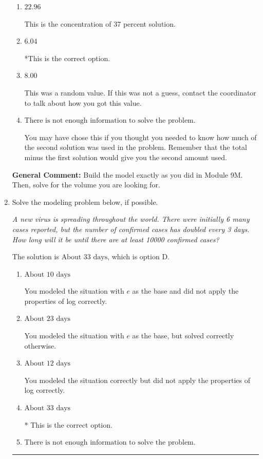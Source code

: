 \documentclass{extbook}[14pt]
\newcommand{\litem}[1]{\item #1

\rule{\textwidth}{0.4pt}}
\begin{document}
\begin{enumerate}
{\begin{enumerate}[label=\Alph*.]
This would be correct if Brittany used equal parts of each solution.
\item \( 22.96 \)

This is the concentration of 37 percent solution.
\item \( 6.04 \)

*This is the correct option.
\item \( 8.00 \)

This was a random value. If this was not a guess, contact the coordinator to talk about how you got this value.
\item \( \text{There is not enough information to solve the problem.} \)

You may have chose this if you thought you needed to know how much of the second solution was used in the problem. Remember that the total minus the first solution would give you the second amount used.
\end{enumerate}

\textbf{General Comment:} Build the model exactly as you did in Module 9M. Then, solve for the volume you are looking for.
}
\litem{
Solve the modeling problem below, if possible.

\begin{center}
    \textit{ A new virus is spreading throughout the world. There were initially 6 many cases reported, but the number of confirmed cases has doubled every 3 days. How long will it be until there are at least 10000 confirmed cases? }
\end{center}
The solution is \( \text{About } 33 \text{ days} \), which is option D.\begin{enumerate}[label=\Alph*.]
\item \( \text{About } 10 \text{ days} \)

You modeled the situation with $e$ as the base and did not apply the properties of log correctly.
\item \( \text{About } 23 \text{ days} \)

You modeled the situation with $e$ as the base, but solved correctly otherwise.
\item \( \text{About } 12 \text{ days} \)

You modeled the situation correctly but did not apply the properties of log correctly.
\item \( \text{About } 33 \text{ days} \)

* This is the correct option.
\item \( \text{There is not enough information to solve the problem.} \)


\end{enumerate}}
\end{enumerate}
\end{document}
